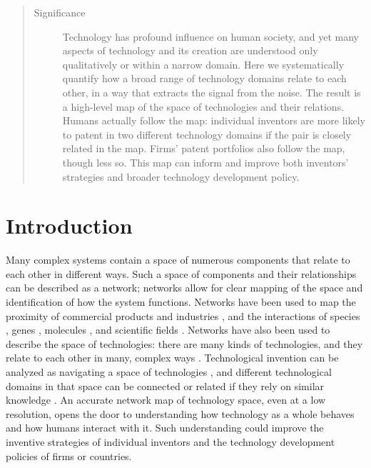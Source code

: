\documentclass[pre,reprint,groupedaddress,superscriptaddress]{revtex4-1}
\begin{document}
\begin{abstract}
\begin{description}
\item[Significance] Technology has profound influence on human society, and yet many aspects of technology and its creation are understood only qualitatively or within a narrow domain. Here we systematically quantify how a broad range of technology domains relate to each other, in a way that extracts the signal from the noise. The result is a high-level map of the space of technologies and their relations. Humans actually follow the map: individual inventors are more likely to patent in two different technology domains if the pair is closely related in the map. Firms' patent portfolios also follow the map, though less so. This map can inform and improve both inventors' strategies and broader technology development policy.
\end{description}
\end{abstract}


\maketitle

\section{Introduction}
Many complex systems contain a space of numerous components that relate to each other in different ways. Such a space of components and their relationships can be described as a network; networks allow for clear mapping of the space and identification of how the system functions.
Networks have been used to map the proximity of commercial products and industries
, and the interactions of species
, genes
, molecules
, and scientific fields \cite{Neffke2013, Cristelli2013, Bryce2009, Hidalgo2007,Verspagen1997,Sanders2003, Ulrich2007, Stone1990, Muller2008, Yu2008, Rual2005,Shiffrin2004, Rafols2010, Leydesdorff2013, Uzzi2013}. Networks have also been used to describe the space of technologies: there are many kinds of technologies, and they relate to each other in many, complex ways \cite{Kay2014, Leydesdorff2014, Breschi2003}. Technological invention can be analyzed as navigating a space of technologies \cite{Kauffman2000, Strumsky2002, Fleming2004, Silverberg2005, Frenken2006, Silverberg2007}, and different technological domains in that space can be connected or related if they rely on similar knowledge \cite{Leydesdorff2014, Arthur2009, Shiffrin2004,Mane2004, Verspagen1997, Jaffe1986}. An accurate network map of technology space, even at a low resolution, opens the door to understanding how technology as a whole behaves and how humans interact with it. Such understanding could improve the inventive strategies of individual inventors and the technology development policies of firms or countries.
\end{document}
